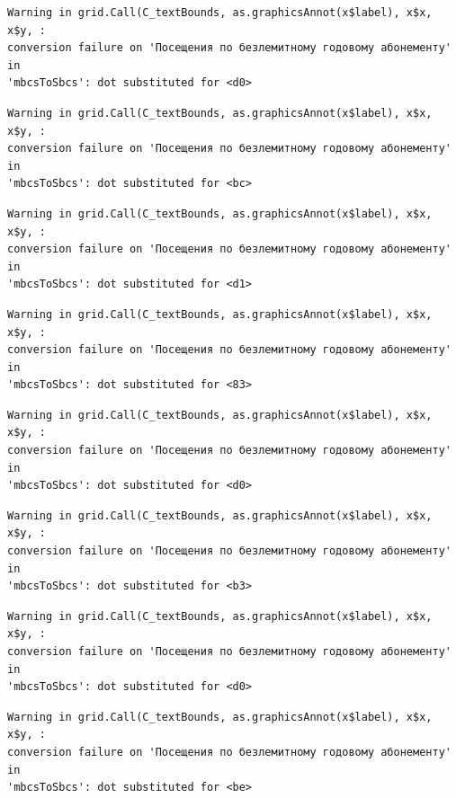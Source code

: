 \documentclass[
  letterpaper,
  DIV=11,
  numbers=noendperiod]{scrartcl}
\begin{document}
\begin{verbatim}
Warning in grid.Call(C_textBounds, as.graphicsAnnot(x$label), x$x, x$y, :
conversion failure on 'Посещения по безлемитному годовому абонементу' in
'mbcsToSbcs': dot substituted for <d0>
\end{verbatim}

\begin{verbatim}
Warning in grid.Call(C_textBounds, as.graphicsAnnot(x$label), x$x, x$y, :
conversion failure on 'Посещения по безлемитному годовому абонементу' in
'mbcsToSbcs': dot substituted for <bc>
\end{verbatim}

\begin{verbatim}
Warning in grid.Call(C_textBounds, as.graphicsAnnot(x$label), x$x, x$y, :
conversion failure on 'Посещения по безлемитному годовому абонементу' in
'mbcsToSbcs': dot substituted for <d1>
\end{verbatim}

\begin{verbatim}
Warning in grid.Call(C_textBounds, as.graphicsAnnot(x$label), x$x, x$y, :
conversion failure on 'Посещения по безлемитному годовому абонементу' in
'mbcsToSbcs': dot substituted for <83>
\end{verbatim}

\begin{verbatim}
Warning in grid.Call(C_textBounds, as.graphicsAnnot(x$label), x$x, x$y, :
conversion failure on 'Посещения по безлемитному годовому абонементу' in
'mbcsToSbcs': dot substituted for <d0>
\end{verbatim}

\begin{verbatim}
Warning in grid.Call(C_textBounds, as.graphicsAnnot(x$label), x$x, x$y, :
conversion failure on 'Посещения по безлемитному годовому абонементу' in
'mbcsToSbcs': dot substituted for <b3>
\end{verbatim}

\begin{verbatim}
Warning in grid.Call(C_textBounds, as.graphicsAnnot(x$label), x$x, x$y, :
conversion failure on 'Посещения по безлемитному годовому абонементу' in
'mbcsToSbcs': dot substituted for <d0>
\end{verbatim}

\begin{verbatim}
Warning in grid.Call(C_textBounds, as.graphicsAnnot(x$label), x$x, x$y, :
conversion failure on 'Посещения по безлемитному годовому абонементу' in
'mbcsToSbcs': dot substituted for <be>
\end{verbatim}
\end{document}
